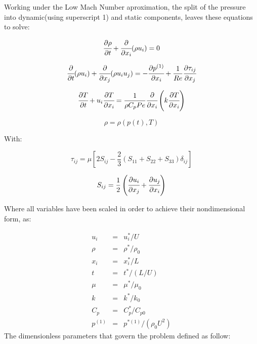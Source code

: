 \documentclass[titlepage,11pt]{article}
\newcommand\ppt[1]{\cfrac{\partial#1}{\partial t}} %
\newcommand\ppi[1]{\cfrac{\partial#1}{\partial x_i}} %
\newcommand\ppj[1]{\cfrac{\partial#1}{\partial x_j}} %
\begin{document}
Working under the Low Mach Number aproximation, the split of the pressure into dynamic(using superscript 1) and static components, leaves these equations to solve:

 \begin{equation}
\ppt{\rho}+\ppi{}(\rho u_i)=0
\label{eq:continuity}
\end{equation}

 \begin{equation}
\ppt{}(\rho u_i)+\ppj{}(\rho u_i u_j)=-\ppi{p^{(1)}}+\frac{1}{Re}\ppj{\tau_{ij}}
\label{eq:momentum}
\end{equation}

 \begin{equation}
\ppt{T}+u_i \ppi{T}=\frac{1}{\rho C_p Pe}\ppi{}\left( k \ppi{T} \right)
\label{energy}
\end{equation}


\begin{equation}
\rho=\rho(p(t),T)
\label{eq:EOS1}
\end{equation}

With: 

\begin{equation}
\tau_{ij}=\mu[2 S_{ij}-\frac{2}{3} (S_{11}+S_{22}+S_{33}) \delta_{ij}]
\label{eq:tau}
\end{equation}

\begin{equation}
S_{ij}=\frac{1}{2} \left( \ppj{u_i}+\ppi{u_j} \right)
\label{eq:Sij}
\end{equation}

Where all variables have been scaled in order to achieve their nondimensional form, as: 

\begin{equation}
	\begin{array}{lcl}
		u_i    &=& u_i^{*}/U              \\  
		\rho &=& \rho^{*}/\rho_0 \\
		x_i   &=& x_i^{*}/L                  \\
		t       &=& t^{*}/(L/U)                   \\
		\mu &=& \mu^{*}/\mu_0    \\
		k      &=& k^{*}/k_0                      \\
		C_p &=& C_p^{*}/C_{p0}      \\
		p^{(1)}&=&p^{*(1)}/(\rho_0 U^2)
	\end{array}
\end{equation}
The dimensionless parameters that govern the problem defined as follow:
\end{document}
